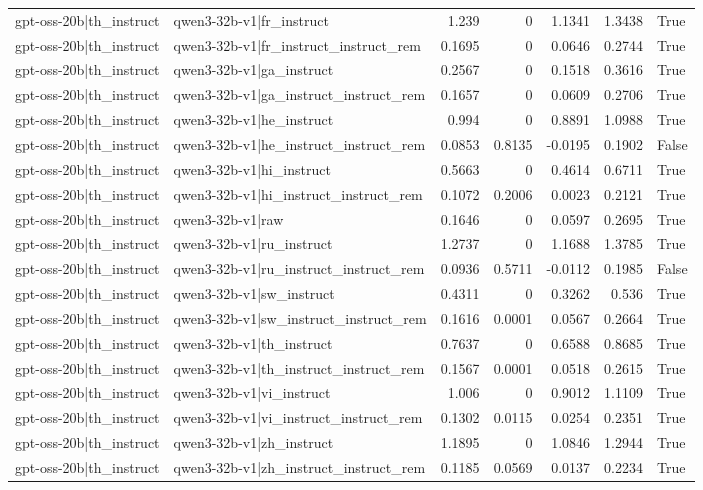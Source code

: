 \begin{table}
\begin{tabular}{l l r r r r l}
gpt-oss-20b|th_instruct & qwen3-32b-v1|fr_instruct & 1.239 & 0 & 1.1341 & 1.3438 & True \\
gpt-oss-20b|th_instruct & qwen3-32b-v1|fr_instruct_instruct_rem & 0.1695 & 0 & 0.0646 & 0.2744 & True \\
gpt-oss-20b|th_instruct & qwen3-32b-v1|ga_instruct & 0.2567 & 0 & 0.1518 & 0.3616 & True \\
gpt-oss-20b|th_instruct & qwen3-32b-v1|ga_instruct_instruct_rem & 0.1657 & 0 & 0.0609 & 0.2706 & True \\
gpt-oss-20b|th_instruct & qwen3-32b-v1|he_instruct & 0.994 & 0 & 0.8891 & 1.0988 & True \\
gpt-oss-20b|th_instruct & qwen3-32b-v1|he_instruct_instruct_rem & 0.0853 & 0.8135 & -0.0195 & 0.1902 & False \\
gpt-oss-20b|th_instruct & qwen3-32b-v1|hi_instruct & 0.5663 & 0 & 0.4614 & 0.6711 & True \\
gpt-oss-20b|th_instruct & qwen3-32b-v1|hi_instruct_instruct_rem & 0.1072 & 0.2006 & 0.0023 & 0.2121 & True \\
gpt-oss-20b|th_instruct & qwen3-32b-v1|raw & 0.1646 & 0 & 0.0597 & 0.2695 & True \\
gpt-oss-20b|th_instruct & qwen3-32b-v1|ru_instruct & 1.2737 & 0 & 1.1688 & 1.3785 & True \\
gpt-oss-20b|th_instruct & qwen3-32b-v1|ru_instruct_instruct_rem & 0.0936 & 0.5711 & -0.0112 & 0.1985 & False \\
gpt-oss-20b|th_instruct & qwen3-32b-v1|sw_instruct & 0.4311 & 0 & 0.3262 & 0.536 & True \\
gpt-oss-20b|th_instruct & qwen3-32b-v1|sw_instruct_instruct_rem & 0.1616 & 0.0001 & 0.0567 & 0.2664 & True \\
gpt-oss-20b|th_instruct & qwen3-32b-v1|th_instruct & 0.7637 & 0 & 0.6588 & 0.8685 & True \\
gpt-oss-20b|th_instruct & qwen3-32b-v1|th_instruct_instruct_rem & 0.1567 & 0.0001 & 0.0518 & 0.2615 & True \\
gpt-oss-20b|th_instruct & qwen3-32b-v1|vi_instruct & 1.006 & 0 & 0.9012 & 1.1109 & True \\
gpt-oss-20b|th_instruct & qwen3-32b-v1|vi_instruct_instruct_rem & 0.1302 & 0.0115 & 0.0254 & 0.2351 & True \\
gpt-oss-20b|th_instruct & qwen3-32b-v1|zh_instruct & 1.1895 & 0 & 1.0846 & 1.2944 & True \\
gpt-oss-20b|th_instruct & qwen3-32b-v1|zh_instruct_instruct_rem & 0.1185 & 0.0569 & 0.0137 & 0.2234 & True \\

\end{tabular}
\end{table}
